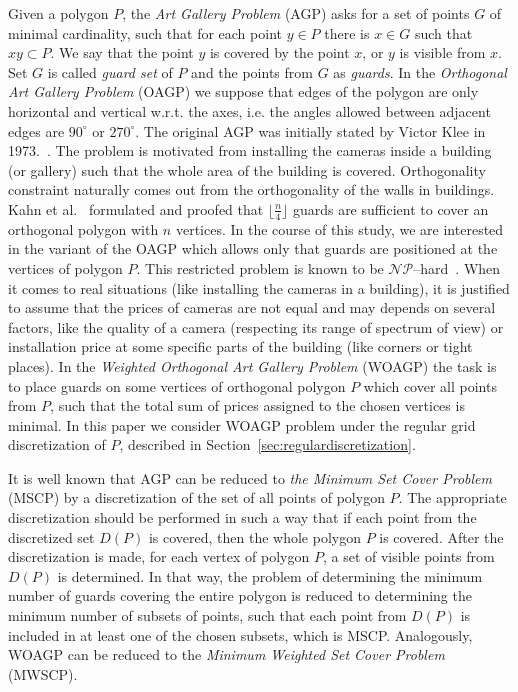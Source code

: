 \documentclass[runningheads,a4paper]{elsarticle}
\begin{document}
	Given a polygon $P$, the \emph{Art Gallery Problem} (AGP) asks for a set of points $G$ of minimal cardinality,  such that for each point $y \in P$ there is $x \in G$ such that $xy \subset P$. We say that the point $y$ is covered by the point $x$, or $y$ is visible from $x$. Set $G$ is called \emph{guard set} of $P$ and the points from $G$ as \emph{guards}. In the \emph{Orthogonal Art Gallery Problem} (OAGP) we suppose that edges of the polygon are only horizontal and vertical w.r.t. the axes, i.e.  the angles allowed between adjacent edges are  $90^{\circ}$ or $270^{\circ}$. The original AGP was initially stated by Victor  Klee in 1973.~\cite{o1987art}.  The problem is motivated from installing the cameras inside a building (or gallery) such that the whole area of the building is covered. Orthogonality constraint naturally comes out from the orthogonality of the walls in buildings. Kahn et al.~\cite{kahn1983traditional} formulated and proofed that 	$\lfloor \frac{n}{4} \rfloor$ guards are  sufficient to cover an orthogonal polygon with $n$ vertices.      In the course of this study, we are interested in the variant of the OAGP which allows only that guards are positioned at the vertices of polygon $P$. This restricted problem is known to be $\mathcal{NP}$--hard~\cite{schuchardt1995two,katz2008guarding}.  When it comes to real situations (like installing the cameras in a building), it is justified to assume that the prices of cameras are not equal and may depends on several factors, like the quality of a camera   (respecting its range of spectrum of view)  or installation price at some specific parts of the building (like corners or tight places).  In the \emph{Weighted Orthogonal Art Gallery Problem} (WOAGP) the task is to place guards on some vertices of orthogonal polygon $P$ which cover all points from $P$, such that the total sum of prices assigned to the chosen vertices is minimal. In this paper we consider WOAGP problem under the regular grid discretization of $P$, described in Section~\ref{sec:regulardiscretization}.
	
	It is well known that AGP can be reduced to \emph{the Minimum Set Cover Problem} (MSCP) by a discretization of the set of all points of polygon $P$. The appropriate discretization should be performed in such a way that if each point from the discretized set $D(P)$ is covered, then the whole polygon $P$ is covered. After the discretization is made, for each vertex of polygon $P$, a set of visible points from $D(P)$ is determined. In that way, the problem of determining the minimum number of guards covering the entire polygon is reduced to determining the minimum number of subsets of points, such that each point from $D(P)$ is included in at least one of the chosen subsets, which is MSCP. Analogously, WOAGP can be reduced to the \emph{Minimum Weighted  Set Cover Problem} (MWSCP).
	
\end{document}
